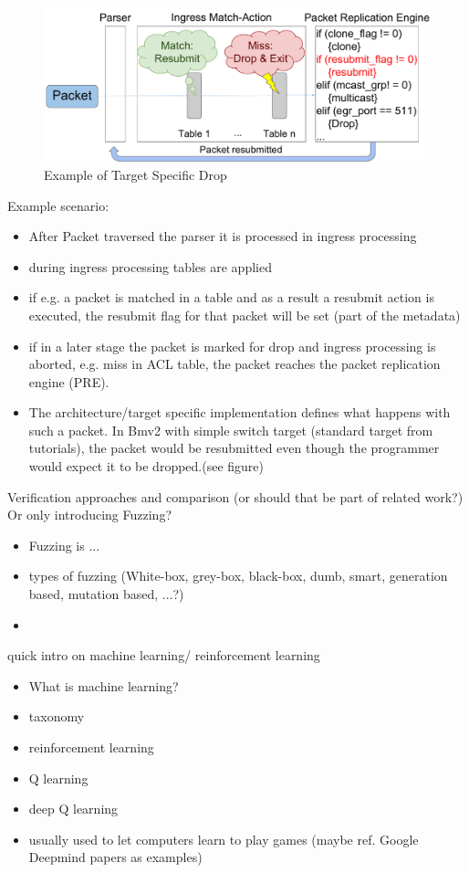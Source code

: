 \begin{figure}[tp]
\centering
\includegraphics[width=\linewidth]{figures/scenario_v5.pdf}
\caption{Example of Target Specific Drop} %
\end{figure}
Example scenario:
\begin{itemize}
    \item After Packet traversed the parser it is processed in ingress processing
    \item during ingress processing tables are applied
    \item if e.g. a packet is matched in a table and as a result a resubmit action is executed, the resubmit flag for that packet will be set (part of the metadata)
    \item if in a later stage the packet is marked for drop and ingress processing is aborted, e.g. miss in ACL table, the packet reaches the packet replication engine (PRE).
    \item The architecture/target specific implementation defines what happens with such a packet. In Bmv2 with simple switch target (standard target from tutorials), the packet would be resubmitted even though the programmer would expect it to be dropped.(see figure)
\end{itemize}

Verification approaches and comparison (or should that be part of related work?) Or only introducing Fuzzing?
\begin{itemize}
    \item Fuzzing is ...
    \item types of fuzzing (White-box, grey-box, black-box, dumb, smart, generation based, mutation based, ...?)
    \item
\end{itemize}
quick intro on machine learning/ reinforcement learning
\begin{itemize}
    \item What is machine learning?
    \item taxonomy
    \item reinforcement learning
    \item Q learning
    \item deep Q learning
    \item usually used to let computers learn to play games (maybe ref. Google Deepmind papers as examples)
\end{itemize}

